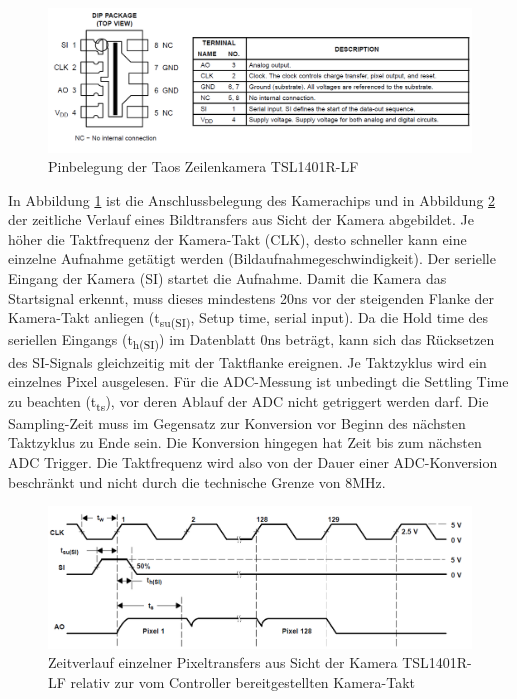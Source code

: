\begin{figure}[H] %
\includegraphics[width=.90\textwidth]{sec7/images/CamPinning} 
\centering
\captionsetup{width=.95\textwidth}
\caption[Pinbelegung der Taos Zeilenkamera TSL1401R-LF ~\protect\cite{Taos}]{Pinbelegung der Taos Zeilenkamera TSL1401R-LF ~\protect\cite{Taos}}\centering
\label{fig:CamPinning}
\end{figure}

In Abbildung \ref{fig:CamPinning} ist die Anschlussbelegung des Kamerachips und in Abbildung \ref{fig:CamWaveform} der zeitliche Verlauf eines Bildtransfers aus Sicht der Kamera abgebildet. Je höher die Taktfrequenz der Kamera-Takt (CLK), desto schneller kann eine einzelne Aufnahme getätigt werden (Bildaufnahmegeschwindigkeit). Der serielle Eingang der Kamera (SI) startet die Aufnahme. Damit die Kamera das Startsignal erkennt, muss dieses mindestens 20ns vor der steigenden Flanke der Kamera-Takt anliegen (t\textsubscript{su(SI)}, \glqq{}Setup time, serial input\grqq{}). Da die \glqq{}Hold time\grqq{} des seriellen Eingangs (t\textsubscript{h(SI)}) im Datenblatt 0ns beträgt, kann sich das Rücksetzen des SI-Signals gleichzeitig mit der Taktflanke ereignen. Je Taktzyklus wird ein einzelnes Pixel ausgelesen. Für die ADC-Messung ist unbedingt die \glqq{}Settling Time\grqq{} zu beachten (t\textsubscript{ts}), vor deren Ablauf der ADC nicht getriggert werden darf. Die Sampling-Zeit muss im Gegensatz zur Konversion vor Beginn des nächsten Taktzyklus zu Ende sein. Die Konversion hingegen hat Zeit bis zum nächsten ADC Trigger. Die Taktfrequenz wird also von der Dauer einer ADC-Konversion beschränkt und nicht durch die technische Grenze von 8MHz. 

\begin{figure}[H] %
\includegraphics[width=.95\textwidth]{sec7/images/CamWaveform} 
\centering
\captionsetup{width=.95\textwidth}
\caption[Zeitverlauf einzelner Pixeltransfers aus Sicht der Kamera ~\protect\cite{Taos}]{Zeitverlauf einzelner Pixeltransfers aus Sicht der Kamera TSL1401R-LF  relativ zur vom Controller bereitgestellten Kamera-Takt ~\protect\cite{Taos}}\centering
\label{fig:CamWaveform}
\end{figure}

